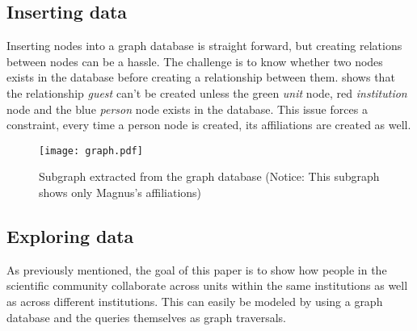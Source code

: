\subsection*{Inserting data}
Inserting nodes into a graph database is straight forward, but creating relations between nodes can be a hassle. The challenge is to know whether two nodes exists in the database before creating a relationship between them.  shows that the relationship \textit{guest} can't be created unless the green \textit{unit} node, red \textit{institution} node and the blue \textit{person} node exists in the database. This issue forces a constraint, every time a person node is created, its affiliations are created as well.

\begin{figure}[h]
  \centering
  \texttt{[image: graph.pdf]}
  \caption{Subgraph extracted from the graph database (Notice: This subgraph shows only Magnus's affiliations)}
  \label{fig:subgraph}
\end{figure}


\subsection*{Exploring data}
As previously mentioned, the goal of this paper is to show how people in the scientific community collaborate across units within the same institutions as well as across different institutions.
This can easily be modeled by using a graph database and the queries themselves as graph traversals.
